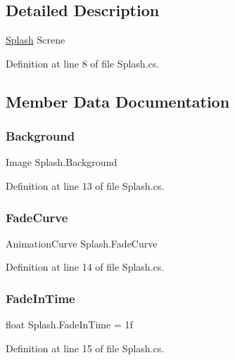 \subsection{Detailed Description}
\mbox{\hyperlink{class_splash}{Splash}} Screne 



Definition at line 8 of file Splash.\+cs.



\subsection{Member Data Documentation}
\mbox{\label{class_splash_a8aa680e0ccdf3e60f38904be2927fe62}} 
\subsubsection{\texorpdfstring{Background}{Background}}
{\footnotesize\ttfamily Image Splash.\+Background}



Definition at line 13 of file Splash.\+cs.

\mbox{\label{class_splash_aefd5da39acda17b72a9587bed7f0cb00}} 
\subsubsection{\texorpdfstring{Fade\+Curve}{FadeCurve}}
{\footnotesize\ttfamily Animation\+Curve Splash.\+Fade\+Curve}



Definition at line 14 of file Splash.\+cs.

\mbox{\label{class_splash_a3c3bb4bb75f5d69ec4d716c2eb907d2a}} 
\subsubsection{\texorpdfstring{Fade\+In\+Time}{FadeInTime}}
{\footnotesize\ttfamily float Splash.\+Fade\+In\+Time = 1f}



Definition at line 15 of file Splash.\+cs.

